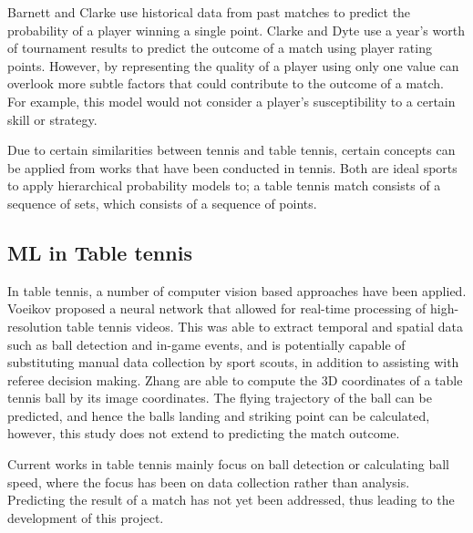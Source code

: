 Barnett and Clarke \cite{barnett2005combining} use historical data from past matches to predict the probability of a player winning a single point. Clarke and Dyte \cite{clarke2000using} use a year's worth of tournament results to predict the outcome of a match using player rating points.
However, by representing the quality of a player using only one value can overlook more subtle factors that could contribute to the outcome of a match. For example, this model would not consider a player's susceptibility to a certain skill or strategy.

Due to certain similarities between tennis and table tennis, certain concepts can be applied from works that have been conducted in tennis. Both are ideal sports to apply hierarchical probability models to; a table tennis match consists of a sequence of sets, which consists of a sequence of points.

\subsection{ML in Table tennis}
In table tennis, a number of computer vision based approaches have been applied. Voeikov \etal \cite{voeikov2020ttnet} proposed a neural network that allowed for real-time processing of high-resolution table tennis videos. This was able to extract temporal and spatial data such as ball detection and in-game events, and is potentially capable of substituting manual data collection by sport scouts, in addition to assisting with referee decision making. Zhang \etal \cite{zhang2010visual} are able to compute the 3D coordinates of a table tennis ball by its image coordinates. The flying trajectory of the ball can be predicted, and hence the balls landing and striking point can be calculated, however, this study does not extend to predicting the match outcome.

Current works in table tennis mainly focus on ball detection or calculating ball speed, where the focus has been on data collection rather than analysis. Predicting the result of a match has not yet been addressed, thus leading to the development of this project.


